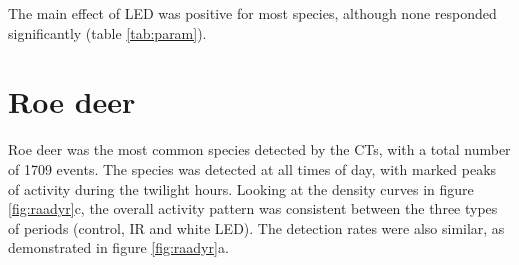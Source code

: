 The main effect of LED was positive for most species, although none responded significantly (table \ref{tab:param}). %
\clearpage

\begin{table}[ht]  %

\caption[Model results]
{ \small 
Results of Poisson mixed effects models on detection rate of species at 56 different locations in southeastern Norway, with three different treatment levels interacting with time since deployment (Time); periods from sites unchanged through the the whole study period (Intercept), periods with only IR camera (IR), periods with an additional white LED camera (wLED). Random effects are location ID and week of year. 
}
\label{tab:param}
\footnotesize


\pagestyle{empty}
%


\clearpage %
\pagestyle{fancy}

\section{Roe deer}
Roe deer was the most common species detected by the CTs, with a total number of 1709 events.
The species was detected at all times of day, with marked peaks of activity during the twilight hours.
Looking at the density curves in figure \ref{fig:raadyr}c, the overall activity pattern was consistent between the three types of periods (control, IR and white LED). 
The detection rates were also similar, as demonstrated in figure \ref{fig:raadyr}a.


\end{table}
